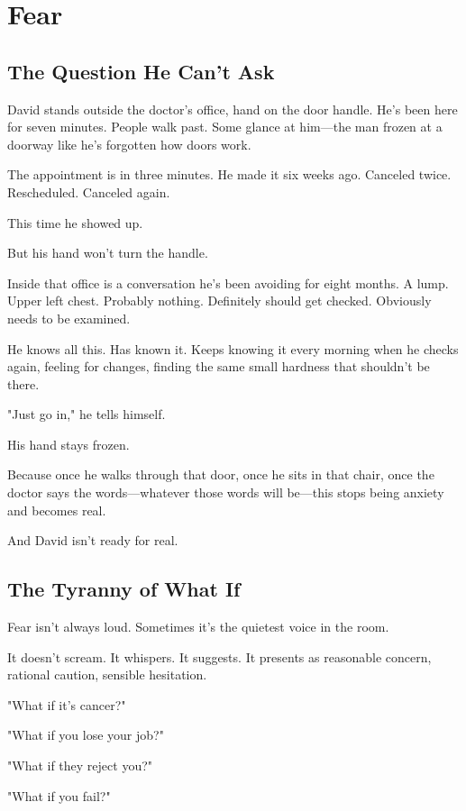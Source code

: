 \documentclass[11pt,twoside]{book}
\begin{document}
\chapter{Fear}

\section*{The Question He Can't Ask}

David stands outside the doctor's office, hand on the door handle. He's been here for seven minutes. People walk past. Some glance at him—the man frozen at a doorway like he's forgotten how doors work.

The appointment is in three minutes. He made it six weeks ago. Canceled twice. Rescheduled. Canceled again.

This time he showed up.

But his hand won't turn the handle.

Inside that office is a conversation he's been avoiding for eight months. A lump. Upper left chest. Probably nothing. Definitely should get checked. Obviously needs to be examined.

He knows all this. Has known it. Keeps knowing it every morning when he checks again, feeling for changes, finding the same small hardness that shouldn't be there.

"Just go in," he tells himself.

His hand stays frozen.

Because once he walks through that door, once he sits in that chair, once the doctor says the words—whatever those words will be—this stops being anxiety and becomes real.

And David isn't ready for real.

\section*{The Tyranny of What If}

Fear isn't always loud. Sometimes it's the quietest voice in the room.

It doesn't scream. It whispers. It suggests. It presents as reasonable concern, rational caution, sensible hesitation.

"What if it's cancer?"

"What if you lose your job?"

"What if they reject you?"

"What if you fail?"
\end{document}
